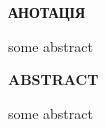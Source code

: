 \begin{center}
\textbf{АНОТАЦІЯ}
\end{center}

some abstract

\newpage

\begin{center}
\textbf{ABSTRACT}
\end{center}

some abstract